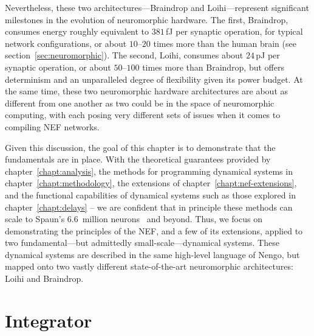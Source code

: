 Nevertheless, these two architectures---Braindrop and Loihi---represent significant milestones in the evolution of neuromorphic hardware.
The first, Braindrop, consumes energy roughly equivalent to $381$\,fJ per synaptic operation, for typical network configurations, or about $10$--$20$ times more than the human brain (see section~\ref{sec:neuromorphic}).
The second, Loihi, consumes about $24$\,pJ per synaptic operation, or about $50$--$100$ times more than Braindrop, but offers determinism and an unparalleled degree of flexibility given its power budget.
At the same time, these two neuromorphic hardware architectures are about as different from one another as two could be in the space of neuromorphic computing, with each posing very different sets of issues when it comes to compiling NEF networks.

Given this discussion, the goal of this chapter is to demonstrate that the fundamentals are in place.
With the theoretical guarantees provided by chapter~\ref{chapt:analysis}, the methods for programming dynamical systems in chapter~\ref{chapt:methodology}, the extensions of chapter~\ref{chapt:nef-extensions}, and the functional capabilities of dynamical systems such as those explored in chapter~\ref{chapt:delays} -- we are confident that in principle these methods can scale to Spaun's 6.6~million neurons~\citep{choo2018} and beyond.
Thus, we focus on demonstrating the principles of the NEF, and a few of its extensions, applied to two fundamental---but admittedly small-scale---dynamical systems.
These dynamical systems are described in the same high-level language of Nengo, but mapped onto two vastly different state-of-the-art neuromorphic architectures: Loihi and Braindrop.

\section{Integrator}
\label{sec:integrator}

